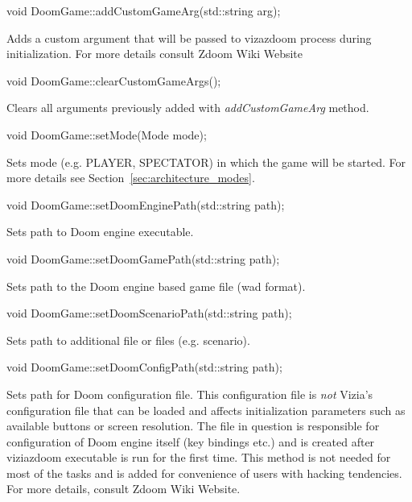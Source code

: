 \vspace{20pt}
\begin{clinee}
void DoomGame::addCustomGameArg(std::string arg);
\end{clinee}
	Adds a custom argument that will be passed to vizazdoom process during initialization. For more details consult Zdoom Wiki Website\cite{zdoom-wiki}


\vspace{20pt}
\begin{clinee}
void DoomGame::clearCustomGameArgs();
\end{clinee}
	Clears all arguments previously added with \emph{addCustomGameArg} method.


\vspace{20pt}
\begin{clinee}
void DoomGame::setMode(Mode mode);
\end{clinee}
	Sets mode (e.g. PLAYER, SPECTATOR) in which the game will be started. For more details see Section~\ref{sec:architecture_modes}.


\vspace{20pt}
\begin{clinee}
void DoomGame::setDoomEnginePath(std::string path);
\end{clinee}

Sets path to Doom engine executable.


\vspace{20pt}
\begin{clinee}
void DoomGame::setDoomGamePath(std::string path);
\end{clinee}

Sets path to the Doom engine based game file (wad format).


\vspace{20pt}
\begin{clinee}
void DoomGame::setDoomScenarioPath(std::string path);
\end{clinee}
	Sets path to additional file or files (e.g. scenario).


\vspace{20pt}
\begin{clinee}
void DoomGame::setDoomConfigPath(std::string path);
\end{clinee}
	Sets path for Doom configuration file. This configuration file is \emph{not} Vizia's configuration file that can be loaded and affects initialization parameters such as available buttons or screen resolution. The file in question is responsible for configuration of Doom engine itself (key bindings etc.) and is created after viziazdoom executable is run for the first time. This method is not needed for most of the tasks and is added for convenience of users with hacking tendencies. For more details, consult Zdoom Wiki Website\cite{zdoom-wiki}.


